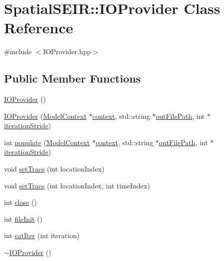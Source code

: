 \hypertarget{classSpatialSEIR_1_1IOProvider}{\section{Spatial\-S\-E\-I\-R\-:\-:I\-O\-Provider Class Reference}
\label{classSpatialSEIR_1_1IOProvider}
}


{\ttfamily \#include $<$I\-O\-Provider.\-hpp$>$}

\subsection*{Public Member Functions}
\begin{DoxyCompactItemize}
\item 
\hyperlink{classSpatialSEIR_1_1IOProvider_ae89a408ae26e4a8b0dc6ed7279dcb7db}{I\-O\-Provider} ()
\item 
\hyperlink{classSpatialSEIR_1_1IOProvider_a933b502eeaa05b44bf1bef52c042659c}{I\-O\-Provider} (\hyperlink{classSpatialSEIR_1_1ModelContext}{Model\-Context} $\ast$\hyperlink{classSpatialSEIR_1_1IOProvider_add6cc02df595bc12b3ac76ce148cc3dc}{context}, std\-::string $\ast$\hyperlink{classSpatialSEIR_1_1IOProvider_a744600dd48a3b8a0f6d65dda5f160bda}{out\-File\-Path}, int $\ast$\hyperlink{classSpatialSEIR_1_1IOProvider_a756afb68ee349d9715566fa9fdc4d37e}{iteration\-Stride})
\item 
int \hyperlink{classSpatialSEIR_1_1IOProvider_a3472f7209ca2a3759a47e619f7832432}{populate} (\hyperlink{classSpatialSEIR_1_1ModelContext}{Model\-Context} $\ast$\hyperlink{classSpatialSEIR_1_1IOProvider_add6cc02df595bc12b3ac76ce148cc3dc}{context}, std\-::string $\ast$\hyperlink{classSpatialSEIR_1_1IOProvider_a744600dd48a3b8a0f6d65dda5f160bda}{out\-File\-Path}, int $\ast$\hyperlink{classSpatialSEIR_1_1IOProvider_a756afb68ee349d9715566fa9fdc4d37e}{iteration\-Stride})
\item 
void \hyperlink{classSpatialSEIR_1_1IOProvider_aa7568ce7698cad0aea3c429f1833f0bb}{set\-Trace} (int location\-Index)
\item 
void \hyperlink{classSpatialSEIR_1_1IOProvider_aa61e367e84b6f8a5377f7255877213e3}{set\-Trace} (int location\-Index, int time\-Index)
\item 
int \hyperlink{classSpatialSEIR_1_1IOProvider_a4951df99453c659fa25503781932373c}{close} ()
\item 
int \hyperlink{classSpatialSEIR_1_1IOProvider_afa6b6c8fd164717fd7ccfd1d08c4dca4}{file\-Init} ()
\item 
int \hyperlink{classSpatialSEIR_1_1IOProvider_a5ab95092c0c23757c54440ef1b78ad53}{cat\-Iter} (int iteration)
\item 
\hyperlink{classSpatialSEIR_1_1IOProvider_a1706d3ce051c5d8454fd8cf3b4c51d07}{$\sim$\-I\-O\-Provider} ()
\end{DoxyCompactItemize}
